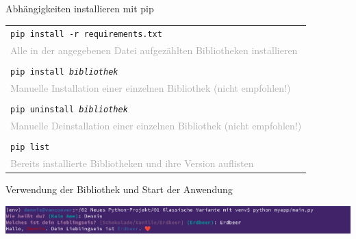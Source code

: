 {{\begin{frame}[fragile]{Abhängigkeiten installieren mit pip}
    {

    \begin{tabular}{|p{}|}
        \hline

        \cellcolor{gray!15}
        \texttt{pip install -r requirements.txt} \\
        \cellcolor{gray!15}
        \textcolor{darkgray}{Alle in der angegebenen Datei aufgezählten Bibliotheken installieren} \\

        \cellcolor{gray!7}
        \\

        \cellcolor{gray!15}
        \texttt{pip install \textit{bibliothek}} \\
        \cellcolor{gray!15}
        \textcolor{darkgray}{Manuelle Installation einer einzelnen Bibliothek (nicht empfohlen!)} \\

        \cellcolor{gray!7}
        \\

        \cellcolor{gray!15}
        \texttt{pip uninstall \textit{bibliothek}} \\
        \cellcolor{gray!15}
        \textcolor{darkgray}{Manuelle Deinstallation einer einzelnen Bibliothek (nicht empfohlen!)} \\

        \cellcolor{gray!7}
        \\

        \cellcolor{gray!15}
        \texttt{pip list} \\
        \cellcolor{gray!15}
        \textcolor{darkgray}{Bereits installierte Bibliotheken und ihre Version auflisten} \\

        \hline
    \end{tabular}
    }
\end{frame}
}

{
\tiny

\begin{frame}[fragile]{Verwendung der Bibliothek und Start der Anwendung}

    \includegraphics[width=\textwidth]{img/venv-ausfuehren}


\end{frame}}}

